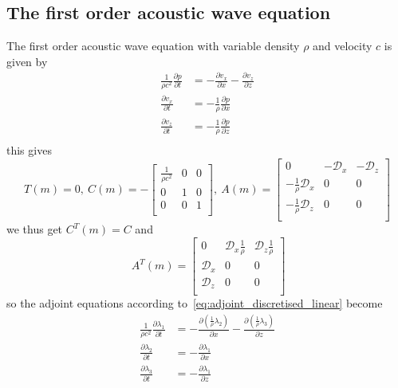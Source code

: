 \documentclass[10pt]{SelfArx} %
\newcommand{\pder}[2][]{\frac{\partial#1}{\partial#2}}
\theoremstyle{definition}
\begin{document}
\subsection{The first order acoustic wave equation}
The first order acoustic wave equation with variable density $\rho$ and velocity $c$ is given by
\begin{equation}
\label{eq:acoustic_first_order_wave_equation}
\begin{aligned}
\frac{1}{\rho c^2}\pder[p]{t} & = -\pder[v_x]{x} - \pder[v_z]{z} \\
 \pder[v_x]{t} & =-\frac{1}{\rho} \pder[p]{x} \\
 \pder[v_z]{t} & =-\frac{1}{\rho} \pder[p]{z} \\
\end{aligned}
\end{equation}
this gives 
\begin{equation}
T(m) = 0, \ C(m) = -
\begin{bmatrix}
\frac{1}{\rho c^2} &0& 0 \\
0&1&0\\
0&0&1\\
\end{bmatrix},
\ A(m) = \begin{bmatrix}
0 &-\mathcal{D}_x& -\mathcal{D}_z \\
-\frac{1}{\rho}\mathcal{D}_x&0&0\\
-\frac{1}{\rho}\mathcal{D}_z&0&0\\
\end{bmatrix}
\end{equation}
we thus get $C^T(m) = C$ and
\begin{equation}
\ A^T(m) = \begin{bmatrix}
0 &\mathcal{D}_x\frac{1}{\rho}& \mathcal{D}_z\frac{1}{\rho} \\
\mathcal{D}_x&0&0\\
\mathcal{D}_z&0&0\\
\end{bmatrix}
\end{equation}
so the adjoint equations according to~\cref{eq:adjoint_discretised_linear} become
\begin{equation}\label{eq:adjoint_acoustic_first_order}
\begin{aligned}
\frac{1}{\rho c^2}\pder[\lambda_1]{t} & = -\pder[\left(\frac{1}{\rho}\lambda_2\right)]{x} - \pder[\left(\frac{1}{\rho}\lambda_3\right)]{z} \\
 \pder[\lambda_2]{t} & =- \pder[\lambda_1]{x} \\
 \pder[\lambda_3]{t} & =-\pder[\lambda_1]{z} \\
\end{aligned}
\end{equation}
\end{document}
